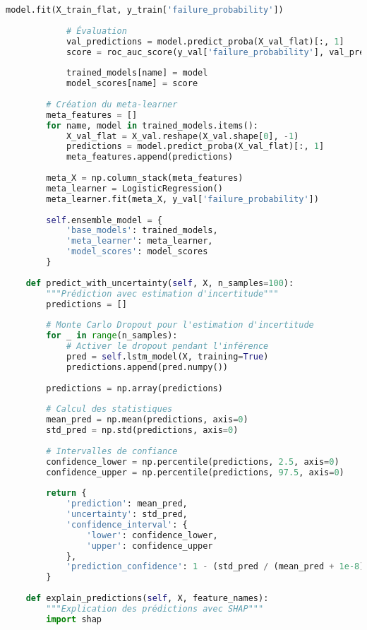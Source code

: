 \documentclass[12pt,a4paper]{report}
\begin{document}
\begin{lstlisting}[language=Python, caption=Modèle de maintenance prédictive avancé]
            model.fit(X_train_flat, y_train['failure_probability'])
            
            # Évaluation
            val_predictions = model.predict_proba(X_val_flat)[:, 1]
            score = roc_auc_score(y_val['failure_probability'], val_predictions)
            
            trained_models[name] = model
            model_scores[name] = score
        
        # Création du meta-learner
        meta_features = []
        for name, model in trained_models.items():
            X_val_flat = X_val.reshape(X_val.shape[0], -1)
            predictions = model.predict_proba(X_val_flat)[:, 1]
            meta_features.append(predictions)
        
        meta_X = np.column_stack(meta_features)
        meta_learner = LogisticRegression()
        meta_learner.fit(meta_X, y_val['failure_probability'])
        
        self.ensemble_model = {
            'base_models': trained_models,
            'meta_learner': meta_learner,
            'model_scores': model_scores
        }
    
    def predict_with_uncertainty(self, X, n_samples=100):
        """Prédiction avec estimation d'incertitude"""
        predictions = []
        
        # Monte Carlo Dropout pour l'estimation d'incertitude
        for _ in range(n_samples):
            # Activer le dropout pendant l'inférence
            pred = self.lstm_model(X, training=True)
            predictions.append(pred.numpy())
        
        predictions = np.array(predictions)
        
        # Calcul des statistiques
        mean_pred = np.mean(predictions, axis=0)
        std_pred = np.std(predictions, axis=0)
        
        # Intervalles de confiance
        confidence_lower = np.percentile(predictions, 2.5, axis=0)
        confidence_upper = np.percentile(predictions, 97.5, axis=0)
        
        return {
            'prediction': mean_pred,
            'uncertainty': std_pred,
            'confidence_interval': {
                'lower': confidence_lower,
                'upper': confidence_upper
            },
            'prediction_confidence': 1 - (std_pred / (mean_pred + 1e-8))
        }
    
    def explain_predictions(self, X, feature_names):
        """Explication des prédictions avec SHAP"""
        import shap
        

\end{lstlisting}
\end{document}
